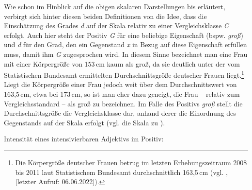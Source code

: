 \noindent Wie schon im Hinblick auf die obigen skalaren Darstellungen  bis  erläutert, verbirgt sich hinter diesen beiden Definitionen von {\citet[132f.]{Gutzmann.2019a}} die Idee, dass die Einschätzung des Grades \textit{d} auf der Skala relativ zu einer Vergleichsklasse \textit{C} erfolgt. Auch hier steht der {Positiv \textit{G}} für eine beliebige Eigenschaft (bspw. \textit{groß}) und \textit{d} für den Grad, den ein Gegenstand \textit{x} in Bezug auf diese Eigenschaft erfüllen muss, damit ihm \textit{G} zugesprochen wird. In diesem Sinne bezeichnet man eine Frau mit einer Körpergröße von 153\,cm kaum als groß, da sie deutlich unter der vom Statistischen Bundesamt ermittelten Durchschnittsgröße deutscher Frauen liegt.\footnote{Die Körpergröße deutscher Frauen betrug im letzten Erhebungszeitraum 2008 bis 2011 laut Statistischem Bundesamt durchschnittlich 163,5\,cm (vgl. \citealt[]{Statistik.2020}, [letzter Aufruf: 06.06.2022]).} Liegt die Körpergröße einer Frau jedoch weit über dem Durchschnittswert von 163,5\,cm, etwa bei {173\,cm}, so ist man eher dazu geneigt, die Frau -- relativ zum Vergleichsstandard -- als groß zu bezeichnen. Im Falle des Positivs \textit{groß} stellt die Durchschnittsgröße die Vergleichsklasse dar, anhand derer die Einordnung des Gegenstands auf der Skala erfolgt (vgl. die Skala {zu )}.

\ea  Intensität eines intensivierbaren Adjektivs im Positiv: \medskip

\centering

\label{Pos01}
\z

